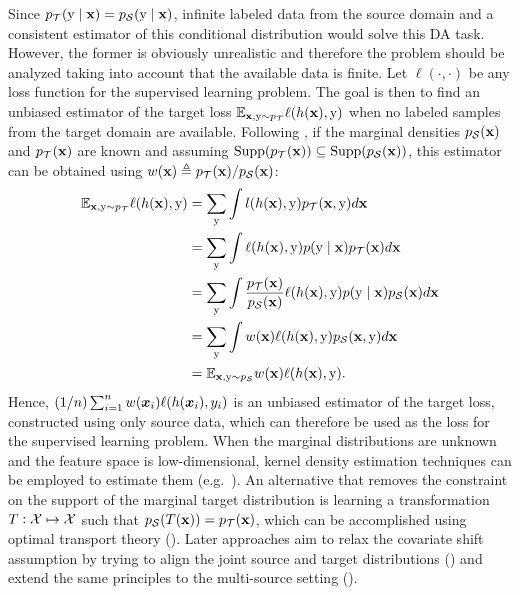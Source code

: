 Since $p_{\mathcal{T}}({\textnormal{y}} \mid {\mathbf{x}}) = p_{\mathcal{S}}({\textnormal{y}} \mid {\mathbf{x}})$, infinite labeled data from the source domain and a consistent estimator of this conditional distribution would solve this DA task. However, the former is obviously unrealistic and therefore the problem should be analyzed taking into account that the available data is finite. Let $\ell(\cdot, \cdot)$ be any loss function for the supervised learning problem. The goal is then to find an unbiased estimator of the target loss $\mathbb{E}_{{\mathbf{x}}, {\textnormal{y}} \sim p_{\mathcal{T}}} \ell(h({\mathbf{x}}),{\textnormal{y}})$ when no labeled samples from the target domain are available. Following \citet{Sugiyama2007}, if the marginal densities $p_{\mathcal{S}}({\mathbf{x}})$ and $p_{\mathcal{T}}({\mathbf{x}})$ are known and assuming $\mathrm{Supp}(p_{\mathcal{T}}({\mathbf{x}})) \subseteq \mathrm{Supp}(p_{\mathcal{S}}({\mathbf{x}}))$, this estimator can be obtained using  $w({\mathbf{x}}) \triangleq p_{\mathcal{T}}({\mathbf{x}})/p_{\mathcal{S}}({\mathbf{x}})$:
\begin{align}
	\mathbb{E}_{{\mathbf{x}}, {\textnormal{y}} \sim p_{\mathcal{T}}} \ell(h({\mathbf{x}}),{\textnormal{y}}) &= \sum_{{\textnormal{y}}} \int l(h({\mathbf{x}}),{\textnormal{y}}) p_{\mathcal{T}}({\mathbf{x}}, {\textnormal{y}}) d{\mathbf{x}} \nonumber\\
	&= \sum_{{\textnormal{y}}} \int \ell(h({\mathbf{x}}),{\textnormal{y}}) p({\textnormal{y}} \mid {\mathbf{x}}) p_{\mathcal{T}}({\mathbf{x}}) d{\mathbf{x}} \nonumber\\
	&= \sum_{{\textnormal{y}}} \int \frac{p_{\mathcal{T}}({\mathbf{x}})}{p_{\mathcal{S}}({\mathbf{x}})} \ell(h({\mathbf{x}}),{\textnormal{y}})  p({\textnormal{y}} \mid {\mathbf{x}}) p_{\mathcal{S}}({\mathbf{x}}) d{\mathbf{x}} \nonumber\\
	&= \sum_{{\textnormal{y}}} \int w({\mathbf{x}}) \ell(h({\mathbf{x}}),{\textnormal{y}})  p_{\mathcal{S}}({\mathbf{x}}, {\textnormal{y}}) d{\mathbf{x}} \nonumber\\
	&= \mathbb{E}_{{\mathbf{x}}, {\textnormal{y}} \sim p_{\mathcal{S}}} w({\mathbf{x}}) \ell(h({\mathbf{x}}),{\textnormal{y}}).
\end{align}
Hence, $(1/n) \sum_{i=1}^{n} w({\bm{x}}_i) \ell(h({\bm{x}}_i),y_i)$ is an unbiased estimator of the target loss, constructed using only source data, which can therefore be used as the loss for the supervised learning problem. When the marginal distributions are unknown and the feature space is low-dimensional, kernel density estimation techniques can be employed to estimate them (e.g.\ \citet{Shimodaira2000,Sugiyama2007,Cortes2010}). An alternative that removes the constraint on the support of the marginal target distribution is learning a transformation $T: {\mathcal{X}} \mapsto {\mathcal{X}}$ such that $p_{{\mathcal{S}}}(T({\mathbf{x}})) = p_{{\mathcal{T}}}({\mathbf{x}})$, which can be accomplished using optimal transport theory (\citet{Courty2015}). Later approaches aim to relax the covariate shift assumption by trying to align the joint source and target distributions (\citet{Courty2017}) and extend the same principles to the multi-source setting (\citet{Turrisi2020}).

